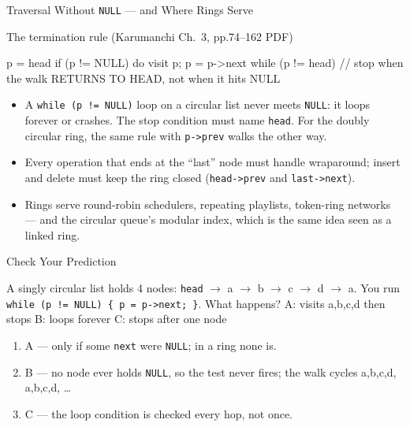 \documentclass[aspectratio=169]{beamer}
\begin{document}
\begin{frame}[fragile]{Traversal Without \texttt{NULL} --- and Where Rings Serve}
  \begin{block}{The termination rule (Karumanchi Ch.~3, pp.74--162 PDF)}
\begin{semiverbatim}
p = head
if (p != NULL) do { visit p; p = p->next } while (p != head)
// stop when the walk RETURNS TO HEAD, not when it hits NULL
\end{semiverbatim}
  \end{block}
  \begin{itemize}
    \item A \texttt{while (p != NULL)} loop on a circular list never meets
      \texttt{NULL}: it loops forever or crashes. The stop condition must name
      \texttt{head}. For the doubly circular ring, the same rule with
      \texttt{p->prev} walks the other way.
    \item Every operation that ends at the ``last'' node must handle
      wraparound; insert and delete must keep the ring closed
      (\texttt{head->prev} and \texttt{last->next}).
    \item Rings serve round-robin schedulers, repeating playlists, token-ring
      networks --- and the circular queue's modular index, which is the same
      idea seen as a linked ring.
  \end{itemize}
\end{frame}

\begin{frame}{Check Your Prediction}
  \begin{block}{A singly circular list holds 4 nodes: \texttt{head} $\to$ a
    $\to$ b $\to$ c $\to$ d $\to$ a. You run
    \texttt{while (p != NULL) \{ p = p->next; \}}. What happens?}
    A: visits a,b,c,d then stops \quad B: loops forever \quad
    C: stops after one node
  \end{block}
  \begin{enumerate}
    \item A --- only if some \texttt{next} were \texttt{NULL}; in a ring none
      is.
    \item B --- no node ever holds \texttt{NULL}, so the test never fires; the
      walk cycles a,b,c,d, a,b,c,d, \dots
    \item C --- the loop condition is checked every hop, not once.
  \end{enumerate}
\end{frame}
\end{document}
